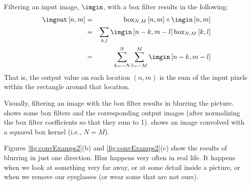 
Filtering an input image, $\imgin$, with a box filter results in the following:
\begin{eqnarray}
	\imgout \left[n,m\right] &=& \text{box}_{N,M} \left[n,m\right] \circ \imgin \left[n,m\right] \nonumber \\
	&=&  \sum_{k,l} \imgin \left[n-k,m-l \right] \text{box}_{N,M} \left[k,l \right] \nonumber \\
	&=&  \sum_{k=-N}^N \sum_{l=-M}^M \imgin \left[n-k,m-l \right]
\end{eqnarray}
That is, the output value on each location $(n,m)$ is the sum of the input pixels within the rectangle around that location.


Visually, filtering an image with the box filter results in blurring the picture. \Fig{\ref{fig:convExamps2}} shows some box filters and the corresponding output images (after normalizing the box filter coefficients so that they sum to 1).  shows an image convolved with a squared box kernel (i.e., $N=M$).

Figures \ref{fig:convExamps2}(b) and \ref{fig:convExamps2}(c)  show the results of blurring in just one direction. Blur happens very often in real life. It happens when we look at something very far away, or at some detail inside a picture, or when we remove our eyeglasses (or wear some that are not ours).



